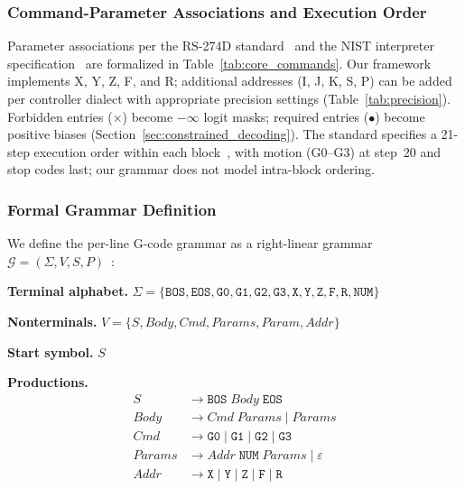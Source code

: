 \documentclass[11pt]{article}
\begin{document}
\subsubsection{Command-Parameter Associations and Execution Order}

Parameter associations per the RS-274D standard~\cite{rs274d} and the NIST interpreter specification~\cite{nist_ngc} are formalized in Table~\ref{tab:core_commands}. Our framework implements X, Y, Z, F, and R; additional addresses (I, J, K, S, P) can be added per controller dialect with appropriate precision settings (Table~\ref{tab:precision}). Forbidden entries ($\times$) become $-\infty$ logit masks; required entries ($\bullet$) become positive biases (Section~\ref{sec:constrained_decoding}). The standard specifies a 21-step execution order within each block~\cite{nist_ngc}, with motion (G0--G3) at step~20 and stop codes last; our grammar does not model intra-block ordering.

\subsubsection{Formal Grammar Definition}
\label{sec:formal_grammar}

We define the per-line G-code grammar as a right-linear grammar $\mathcal{G} = (\Sigma, V, S, P)$~\cite{sipser}:

\smallskip\noindent\textbf{Terminal alphabet.}
$\Sigma = \{\texttt{BOS}, \texttt{EOS}, \texttt{G0}, \texttt{G1}, \texttt{G2}, \texttt{G3}, \texttt{X}, \texttt{Y}, \texttt{Z}, \texttt{F}, \texttt{R}, \texttt{NUM}\}$

\smallskip\noindent\textbf{Nonterminals.}
$V = \{S, \mathit{Body}, \mathit{Cmd}, \mathit{Params}, \mathit{Param}, \mathit{Addr}\}$

\smallskip\noindent\textbf{Start symbol.} $S$

\smallskip\noindent\textbf{Productions.}
\begin{align*}
S &\to \texttt{BOS}\; \mathit{Body}\; \texttt{EOS} \\
\mathit{Body} &\to \mathit{Cmd}\; \mathit{Params} \mid \mathit{Params} \\
\mathit{Cmd} &\to \texttt{G0} \mid \texttt{G1} \mid \texttt{G2} \mid \texttt{G3} \\
\mathit{Params} &\to \mathit{Addr}\; \texttt{NUM}\; \mathit{Params} \mid \varepsilon \\
\mathit{Addr} &\to \texttt{X} \mid \texttt{Y} \mid \texttt{Z} \mid \texttt{F} \mid \texttt{R}
\end{align*}
\end{document}
